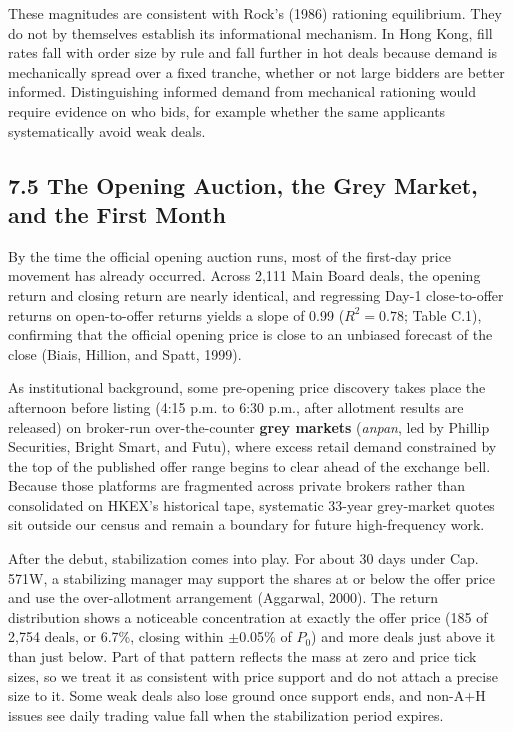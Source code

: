 \documentclass[11pt,letterpaper]{article}
\begin{document}
These magnitudes are consistent with Rock's (1986) rationing equilibrium. They do not by themselves establish its informational mechanism. In Hong Kong, fill rates fall with order size by rule and fall further in hot deals because demand is mechanically spread over a fixed tranche, whether or not large bidders are better informed. Distinguishing informed demand from mechanical rationing would require evidence on who bids, for example whether the same applicants systematically avoid weak deals.

\subsection*{\texorpdfstring{7.5 The Opening Auction, the Grey Market, and the First Month}{7.5 The Opening Auction, the Grey Market, and the First Month}}
By the time the official opening auction runs, most of the first-day price movement has already occurred. Across 2,111 Main Board deals, the opening return and closing return are nearly identical, and regressing Day-1 close-to-offer returns on open-to-offer returns yields a slope of 0.99 ($R^2 = 0.78$; Table C.1), confirming that the official opening price is close to an unbiased forecast of the close (Biais, Hillion, and Spatt, 1999).

As institutional background, some pre-opening price discovery takes place the afternoon before listing (4:15 p.m. to 6:30 p.m., after allotment results are released) on broker-run over-the-counter \textbf{grey markets} (\textit{anpan}, led by Phillip Securities, Bright Smart, and Futu), where excess retail demand constrained by the top of the published offer range begins to clear ahead of the exchange bell. Because those platforms are fragmented across private brokers rather than consolidated on HKEX's historical tape, systematic 33-year grey-market quotes sit outside our census and remain a boundary for future high-frequency work.

After the debut, stabilization comes into play. For about 30 days under Cap. 571W, a stabilizing manager may support the shares at or below the offer price and use the over-allotment arrangement (Aggarwal, 2000). The return distribution shows a noticeable concentration at exactly the offer price (185 of 2,754 deals, or 6.7\%, closing within $\pm$0.05\% of $P_0$) and more deals just above it than just below. Part of that pattern reflects the mass at zero and price tick sizes, so we treat it as consistent with price support and do not attach a precise size to it. Some weak deals also lose ground once support ends, and non-A+H issues see daily trading value fall when the stabilization period expires.
\end{document}
